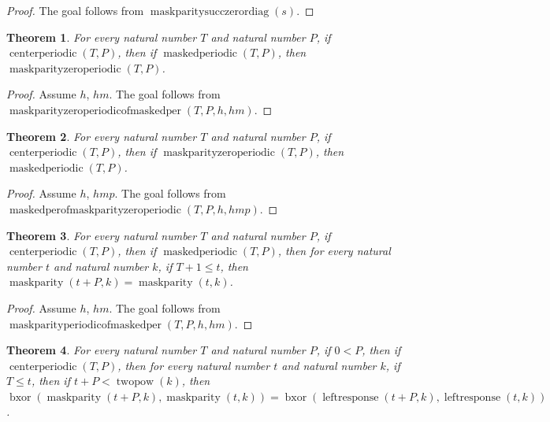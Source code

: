 \documentclass[11pt]{article}
\newtheorem{theorem}{Theorem}[section]
\theoremstyle{definition}
\begin{document}
\begin{proof}
The goal follows from \(\operatorname{maskparitysucczerordiag}(s)\).
\end{proof}
\begin{theorem}
\label{ll:paper:maskparity-zero-periodic-of-maskedper}
For every natural number \(T\) and natural number \(P\), if \(\operatorname{centerperiodic}(T, P)\), then if \(\operatorname{maskedperiodic}(T, P)\), then \(\operatorname{maskparityzeroperiodic}(T, P)\).
\end{theorem}
\begin{proof}
Assume \(h\), \(hm\).
The goal follows from \(\operatorname{maskparityzeroperiodicofmaskedper}(T, P, h, hm)\).
\end{proof}
\begin{theorem}
\label{ll:paper:maskedper-of-maskparity-zero-periodic}
For every natural number \(T\) and natural number \(P\), if \(\operatorname{centerperiodic}(T, P)\), then if \(\operatorname{maskparityzeroperiodic}(T, P)\), then \(\operatorname{maskedperiodic}(T, P)\).
\end{theorem}
\begin{proof}
Assume \(h\), \(hmp\).
The goal follows from \(\operatorname{maskedperofmaskparityzeroperiodic}(T, P, h, hmp)\).
\end{proof}
\begin{theorem}
\label{ll:paper:maskparity-periodic-of-maskedper}
For every natural number \(T\) and natural number \(P\), if \(\operatorname{centerperiodic}(T, P)\), then if \(\operatorname{maskedperiodic}(T, P)\), then for every natural number \(t\) and natural number \(k\), if \(T + 1 \le t\), then \(\operatorname{maskparity}(t + P, k) = \operatorname{maskparity}(t, k)\).
\end{theorem}
\begin{proof}
Assume \(h\), \(hm\).
The goal follows from \(\operatorname{maskparityperiodicofmaskedper}(T, P, h, hm)\).
\end{proof}
\begin{theorem}
\label{ll:paper:periodic-maskparity-shift-p-cone}
For every natural number \(T\) and natural number \(P\), if \(0 < P\), then if \(\operatorname{centerperiodic}(T, P)\), then for every natural number \(t\) and natural number \(k\), if \(T \le t\), then if \(t + P < \operatorname{twopow}(k)\), then \(\operatorname{bxor}(\operatorname{maskparity}(t + P, k), \operatorname{maskparity}(t, k)) = \operatorname{bxor}(\operatorname{leftresponse}(t + P, k), \operatorname{leftresponse}(t, k))\).
\end{theorem}
\end{document}

